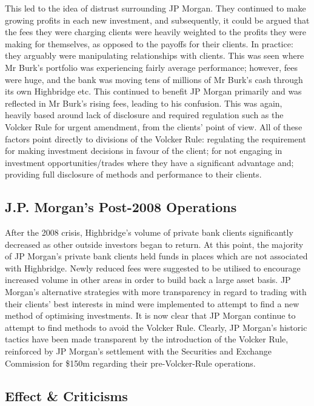 \documentclass[11pt, english]{article}
\begin{document}
	This led to the idea of distrust surrounding JP Morgan. They continued to make growing profits in each new investment, and subsequently, it could be argued that the fees they were charging clients were heavily weighted to the profits they were making for themselves, as opposed to the payoffs for their clients. In practice: they arguably were manipulating relationships with clients. This was seen where Mr Burk's portfolio was experiencing fairly average performance; however, fees were huge, and the bank was moving tens of millions of Mr Burk's cash through its own Highbridge etc. This continued to benefit JP Morgan primarily and was reflected in Mr Burk's rising fees, leading to his confusion. This was again, heavily based around lack of disclosure and required regulation such as the Volcker Rule for urgent amendment, from the clients' point of view. All of these factors point directly to divisions of the Volcker Rule: regulating the requirement for making investment decisions in favour of the client; for not engaging in investment opportunities/trades where they have a significant advantage and; providing full disclosure of methods and performance to their clients.

	\subsection{J.P. Morgan's Post-2008 Operations}

	After the 2008 crisis, Highbridge's volume of private bank clients significantly decreased as other outside investors began to return. At this point, the majority of JP Morgan’s private bank clients held funds in places which are not associated with Highbridge. Newly reduced fees were suggested to be utilised to encourage increased volume in other areas in order to build back a large asset basis. JP Morgan's alternative strategies with more transparency in regard to trading with their clients’ best interests in mind were implemented to attempt to find a new method of optimising investments. It is now clear that JP Morgan continue to attempt to find methods to avoid the Volcker Rule. Clearly, JP Morgan’s historic tactics have been made transparent by the introduction of the Volcker Rule, reinforced by JP Morgan's settlement with the Securities and Exchange Commission for \$150m regarding their pre-Volcker-Rule operations.

	\subsection{Effect \& Criticisms}
\end{document}
